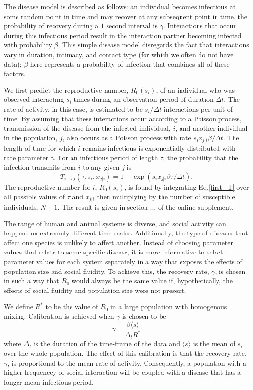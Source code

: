 \documentclass[10pt]{article}
\begin{document}
\begin{multicols}{2}
The disease model is described as follows: an individual becomes infectious at some random point in time and may recover at any subsequent point in time, the probability of recovery during a $1$ second interval is $\gamma$. Interactions that occur during this infectious period result in the interaction partner becoming infected with probability $\beta$. This simple disease model disregards the fact that interactions vary in duration, intimacy, and contact type (for which we often do not have data); $\beta$ here represents a probability of infection that combines all of these factors.

We first predict the reproductive number, $R_{0}(s_{i})$, of an individual who was observed interacting $s_{i}$ times during an observation period of duration $\Delta t$. The rate of activity, in this case, is estimated to be $s_{i}/\Delta t$ interactions per unit of time. By assuming that these interactions occur according to a Poisson process, transmission of the disease from the infected individual, $i$, and another individual in the population, $j$, also occurs as a Poisson process with rate $s_{i}x_{j|i}\beta/\Delta t$. The length of time for which $i$ remains infectious is exponentially distributed with rate parameter $\gamma$. For an infectious period of length $\tau$, the probability that the infection transmits from $i$ to any given $j$ is
\begin{equation}
\label{first_T}
T_{i\rightarrow j}(\tau,s_{i},x_{j|i})=1-\exp(s_{i}x_{j|i}\beta\tau/\Delta t).
\end{equation}
The reproductive number for $i$, $R_{0}(s_{i})$, is found by integrating Eq.\eqref{first_T} over all possible values of $\tau$ and $x_{j|i}$ then multiplying by the number of susceptible individuals, $N-1$. The result is given in section ... of the online supplement.

The range of human and animal systems is diverse, and social activity can happens on extremely different time-scales. Additionally, the type of diseases that affect one species is unlikely to affect another. Instead of choosing parameter values that relate to some specific disease, it is more informative to select parameter values for each system separately in a way that exposes the effects of population size and social fluidity. To achieve this, the recovery rate, $\gamma$, is chosen in such a way that $R_{0}$ would always be the same value if, hypothetically, the effects of social fluidity and population size were not present. 

We define $R^{*}$ to be the value of $R_{0}$ in a large population with homogenous mixing. Calibration is achieved when $\gamma$ is chosen to be  
\begin{equation}
\gamma=\frac{\beta\langle s\rangle}{ \Delta_{t} R^{*}}
\end{equation}
where $\Delta_{t}$ is the duration of the time-frame of the data and $\langle s\rangle$ is the mean of $s_{i}$ over the whole population. The effect of this calibration is that the recovery rate, $\gamma$, is proportional to the mean rate of activity. Consequently, a population with a higher frequencey of social interaction will be coupled with a disease that has a longer mean infectious period. 


\end{multicols}
\end{document}
